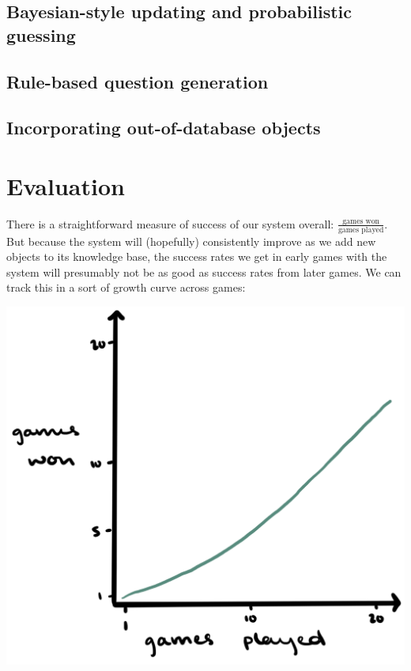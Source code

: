 \documentclass[11pt,a4paper]{article}
\begin{document}
\subsection{Bayesian-style updating and probabilistic guessing}

\lipsum[1]


\subsection{Rule-based question generation}

\lipsum[1]


\subsection{Incorporating out-of-database objects}

\lipsum[1]


\section{Evaluation}

There is a straightforward measure of success of our system overall: $\frac{\text{games won}}{\text{games played}}$.
But because the system will (hopefully) consistently improve as we add new objects to its knowledge base, the success rates we get in early games with the system will presumably not be as good as success rates from later games. 
We can track this in a sort of growth curve across games:

\begin{center}
	\includegraphics[width=.5\linewidth]{growth-curve.png}
\end{center}
\end{document}
